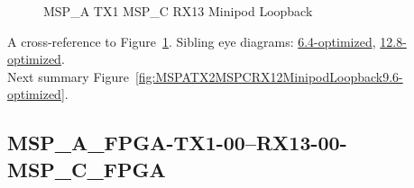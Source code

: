 \begin{figure}[h]
\begin{subfigure}{0.33\textwidth}
\hyperref[sec:MSPAFPGATX106RX1306MSPCFPGA9.6-optimized]{}
\end{subfigure}\hspace*{\fill}
\begin{subfigure}{0.33\textwidth}
\hyperref[sec:MSPAFPGATX107RX1307MSPCFPGA9.6-optimized]{}
\end{subfigure}\hspace*{\fill}
\begin{subfigure}{0.33\textwidth}
\hyperref[sec:MSPAFPGATX108RX1308MSPCFPGA9.6-optimized]{}
\end{subfigure}

\begin{subfigure}{0.33\textwidth}
\hyperref[sec:MSPAFPGATX109RX1309MSPCFPGA9.6-optimized]{}
\end{subfigure}\hspace*{\fill}
\begin{subfigure}{0.33\textwidth}
\hyperref[sec:MSPAFPGATX110RX1310MSPCFPGA9.6-optimized]{}
\end{subfigure}\hspace*{\fill}
\begin{subfigure}{0.33\textwidth}
\hyperref[sec:MSPAFPGATX111RX1311MSPCFPGA9.6-optimized]{}
\end{subfigure}

\caption{MSP\_A TX1 MSP\_C RX13 Minipod Loopback} \label{fig:MSPATX1MSPCRX13MinipodLoopback9.6-optimized}
\end{figure}

A cross-reference to Figure~\ref{fig:MSPATX1MSPCRX13MinipodLoopback9.6-optimized}.
Sibling eye diagrams: \hyperref[sec:MSPATX1MSPCRX13MinipodLoopback6.4-optimized]{6.4-optimized}, \hyperref[sec:MSPATX1MSPCRX13MinipodLoopback12.8-optimized]{12.8-optimized}. \\
Next summary Figure~\ref{fig:MSPATX2MSPCRX12MinipodLoopback9.6-optimized}.
\clearpage
% 
\subsection{MSP\_A\_FPGA-TX1-00--RX13-00-MSP\_C\_FPGA}\label{sec:MSPAFPGATX100RX1300MSPCFPGA9.6-optimized}


